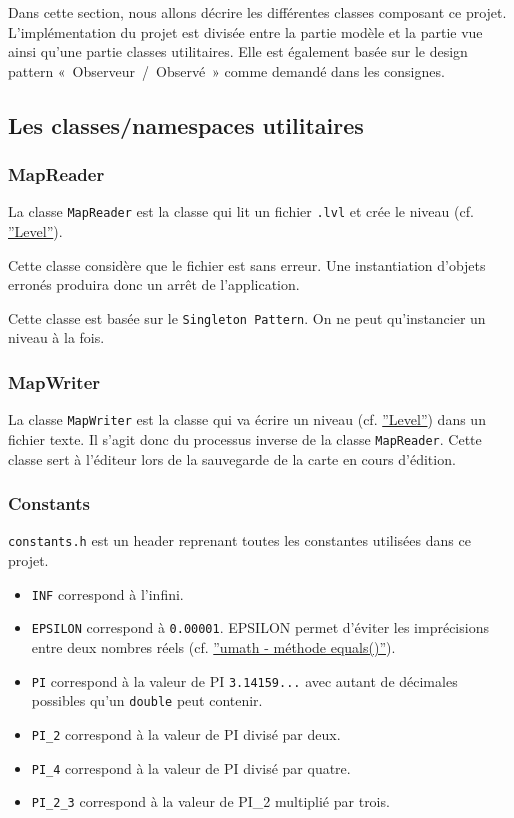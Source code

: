 \documentclass[]{article}
\begin{document}
Dans cette section, nous allons décrire les différentes classes
composant ce projet.
L’implémentation du projet est divisée entre la partie modèle et la partie vue ainsi 
qu'une partie classes utilitaires.
Elle est également basée sur le design pattern «~Observeur~/~Observé~» comme demandé
dans les consignes. 


\subsection{Les classes/namespaces utilitaires}

\subsubsection{MapReader}

La classe \texttt{MapReader} est la classe qui lit un fichier \texttt{.lvl} 
et crée le niveau (cf. \hyperref[Level]{''Level''}).

Cette classe considère que le fichier est sans erreur. Une instantiation d'objets
erronés produira donc un arrêt de l'application.

Cette classe est basée sur le \texttt{Singleton Pattern}. On ne peut qu’instancier un niveau
à la fois.

\subsubsection{MapWriter}

La classe \texttt{MapWriter} est la classe qui va écrire un niveau (cf. \hyperref[Level]{''Level''}) 
dans un fichier texte. Il s’agit donc du processus inverse de la classe
\texttt{MapReader}. Cette classe sert à l’éditeur lors de la sauvegarde de la
carte en cours d’édition.

\subsubsection{\label{Constants}Constants}

\texttt{constants.h} est un header reprenant toutes les constantes utilisées
dans ce projet. 

\begin{itemize}
    \item \texttt{INF} correspond à l'infini.
    \item \texttt{EPSILON} correspond à \texttt{0.00001}. EPSILON permet
        d'éviter les imprécisions entre deux nombres réels (cf. \hyperref[equals]{''umath - méthode equals()''}).
    \item \texttt{PI} correspond à la valeur de PI \texttt{3.14159...} avec
        autant de décimales possibles qu'un \texttt{double} peut contenir.
    \item \texttt{PI\_2} correspond à la valeur de PI divisé par deux.
    \item \texttt{PI\_4} correspond à la valeur de PI divisé par quatre.
    \item \texttt{PI\_2\_3} correspond à la valeur de PI\_2 multiplié par trois.
\end{itemize}
\end{document}
